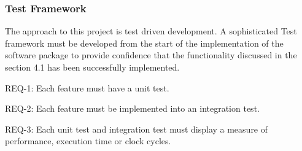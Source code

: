\documentclass[]{report}
\begin{document}
\subsubsection{Test Framework}

The approach to this project is test driven development. A sophisticated Test framework must be developed from the start of the implementation of the software package to provide confidence that the functionality discussed in the section 4.1 has been successfully implemented. \par

REQ-1: Each feature must have a unit test. \par
REQ-2: Each feature must be implemented into an integration test. \par 
REQ-3: Each unit test and integration test must display a measure of performance, execution time or clock cycles. \par


\pagebreak
\end{document}
